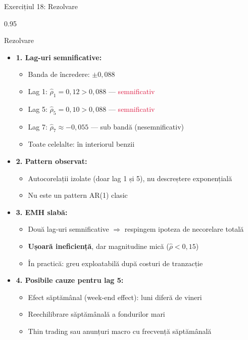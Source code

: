 \documentclass[9pt, aspectratio=169, t]{beamer}
\begin{document}
\begin{frame}[shrink=25]{Exercițiul 18: Rezolvare}
\begin{cminipage}{0.95\textwidth}
\begin{exampleblock}{Rezolvare}
\begin{itemize}\setlength{\itemsep}{0pt}
    \item \textbf{1. Lag-uri semnificative:}
    \begin{itemize}\setlength{\itemsep}{0pt}
        \item Banda de încredere: $\pm 0{,}088$
        \item Lag 1: $\hat\rho_1 = 0{,}12 > 0{,}088$ --- \textcolor{Crimson}{semnificativ}
        \item Lag 5: $\hat\rho_5 = 0{,}10 > 0{,}088$ --- \textcolor{Crimson}{semnificativ}
        \item Lag 7: $\hat\rho_7 \approx -0{,}055$ --- sub bandă (nesemnificativ)
        \item Toate celelalte: în interiorul benzii
    \end{itemize}
    \item \textbf{2. Pattern observat:}
    \begin{itemize}\setlength{\itemsep}{0pt}
        \item Autocorelații izolate (doar lag 1 și 5), nu descreștere exponențială
        \item Nu este un pattern AR(1) clasic
    \end{itemize}
    \item \textbf{3. EMH slabă:}
    \begin{itemize}\setlength{\itemsep}{0pt}
        \item Două lag-uri semnificative $\Rightarrow$ respingem ipoteza de necorelare totală
        \item \textbf{Ușoară ineficiență}, dar magnitudine mică ($\hat\rho < 0{,}15$)
        \item În practică: greu exploatabilă după costuri de tranzacție
    \end{itemize}
    \item \textbf{4. Posibile cauze pentru lag 5:}
    \begin{itemize}\setlength{\itemsep}{0pt}
        \item Efect săptămânal (week-end effect): luni diferă de vineri
        \item Reechilibrare săptămânală a fondurilor mari
        \item Thin trading sau anunțuri macro cu frecvență săptămânală
    \end{itemize}
\end{itemize}
\end{exampleblock}
\end{cminipage}
\end{frame}
\end{document}

